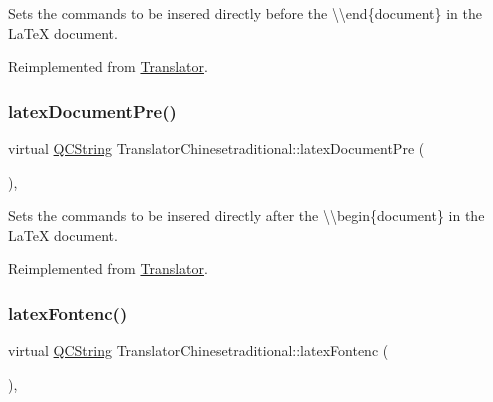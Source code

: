 Sets the commands to be insered directly before the {\ttfamily \textbackslash{}\textbackslash{}end\{document\}} in the La\+TeX document. 

Reimplemented from \mbox{\hyperlink{class_translator_a4bcba7a46f227760b534b35760688da6}{Translator}}.

\mbox{\label{class_translator_chinesetraditional_a76884101bd57a4a09883de76da69aa3f}} 
\subsubsection{\texorpdfstring{latexDocumentPre()}{latexDocumentPre()}}
{\footnotesize\ttfamily virtual \mbox{\hyperlink{class_q_c_string}{Q\+C\+String}} Translator\+Chinesetraditional\+::latex\+Document\+Pre (\begin{DoxyParamCaption}{ }\end{DoxyParamCaption})\hspace{0.3cm}{\ttfamily [inline]}, {\ttfamily [virtual]}}

Sets the commands to be insered directly after the {\ttfamily \textbackslash{}\textbackslash{}begin\{document\}} in the La\+TeX document. 

Reimplemented from \mbox{\hyperlink{class_translator_a9fe33a516bc0ec6825a967294dd5d686}{Translator}}.

\mbox{\label{class_translator_chinesetraditional_a98a1eb93c4d1ab29d05afcdef3ec33bc}} 
\subsubsection{\texorpdfstring{latexFontenc()}{latexFontenc()}}
{\footnotesize\ttfamily virtual \mbox{\hyperlink{class_q_c_string}{Q\+C\+String}} Translator\+Chinesetraditional\+::latex\+Fontenc (\begin{DoxyParamCaption}{ }\end{DoxyParamCaption})\hspace{0.3cm}{\ttfamily [inline]}, {\ttfamily [virtual]}}

